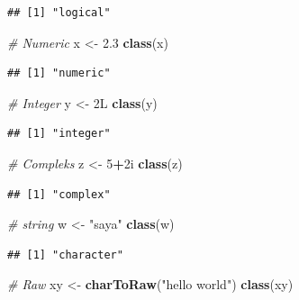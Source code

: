 \documentclass[
]{book}
\newenvironment{Shaded}{\begin{snugshade}}{\end{snugshade}}
\newcommand{\CommentTok}[1]{\textcolor[rgb]{0.56,0.35,0.01}{\textit{#1}}}
\newcommand{\DecValTok}[1]{\textcolor[rgb]{0.00,0.00,0.81}{#1}}
\newcommand{\FloatTok}[1]{\textcolor[rgb]{0.00,0.00,0.81}{#1}}
\newcommand{\FunctionTok}[1]{\textcolor[rgb]{0.13,0.29,0.53}{\textbf{#1}}}
\newcommand{\NormalTok}[1]{#1}
\newcommand{\OtherTok}[1]{\textcolor[rgb]{0.56,0.35,0.01}{#1}}
\newcommand{\SpecialCharTok}[1]{\textcolor[rgb]{0.81,0.36,0.00}{\textbf{#1}}}
\newcommand{\StringTok}[1]{\textcolor[rgb]{0.31,0.60,0.02}{#1}}
\theoremstyle{definition}
\theoremstyle{definition}
\theoremstyle{definition}
\theoremstyle{definition}
\theoremstyle{remark}
\begin{document}
\begin{verbatim}
## [1] "logical"
\end{verbatim}

\begin{Shaded}
\begin{Highlighting}[]
\CommentTok{\# Numeric}
\NormalTok{x }\OtherTok{\textless{}{-}} \FloatTok{2.3}
\FunctionTok{class}\NormalTok{(x)}
\end{Highlighting}
\end{Shaded}

\begin{verbatim}
## [1] "numeric"
\end{verbatim}

\begin{Shaded}
\begin{Highlighting}[]
\CommentTok{\# Integer}
\NormalTok{y }\OtherTok{\textless{}{-}}\NormalTok{ 2L}
\FunctionTok{class}\NormalTok{(y)}
\end{Highlighting}
\end{Shaded}

\begin{verbatim}
## [1] "integer"
\end{verbatim}

\begin{Shaded}
\begin{Highlighting}[]
\CommentTok{\# Compleks}
\NormalTok{z }\OtherTok{\textless{}{-}} \DecValTok{5}\SpecialCharTok{+}\NormalTok{2i}
\FunctionTok{class}\NormalTok{(z)}
\end{Highlighting}
\end{Shaded}

\begin{verbatim}
## [1] "complex"
\end{verbatim}

\begin{Shaded}
\begin{Highlighting}[]
\CommentTok{\# string}
\NormalTok{w }\OtherTok{\textless{}{-}} \StringTok{"saya"}
\FunctionTok{class}\NormalTok{(w)}
\end{Highlighting}
\end{Shaded}

\begin{verbatim}
## [1] "character"
\end{verbatim}

\begin{Shaded}
\begin{Highlighting}[]
\CommentTok{\# Raw}
\NormalTok{xy }\OtherTok{\textless{}{-}} \FunctionTok{charToRaw}\NormalTok{(}\StringTok{"hello world"}\NormalTok{)}
\FunctionTok{class}\NormalTok{(xy)}
\end{Highlighting}
\end{Shaded}
\end{document}
